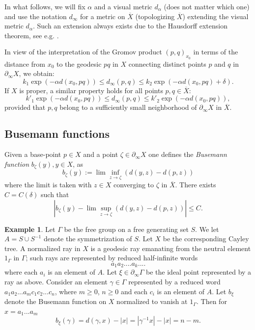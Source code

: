 \documentclass[12pt]{amsbook}%
\theoremstyle{definition}
\newtheorem{example}[thm]{Example}
\theoremstyle{remark}
\numberwithin{section}{chapter}
\numberwithin{subsection}{section}
\numberwithin{figure}{chapter}
\def\Ga{\Gamma}
\def\ga{\gamma}
\def\geo{\partial_\infty}
\def\ol{\overline}
\begin{document}
\medskip 
In what follows, we will fix $\alpha$ and a visual metric $d_\alpha$ (does not matter which one) and 
use the notation $d_\infty$ for a metric on $\ol{X}$ (topologizing $\ol{X}$) extending the visual metric $d_\alpha$. Such an extension 
always exists due to the Hausdorff extension theorem, see e.g. \cite{h-extension}. 

In view of the interpretation of the Gromov product $(p,q)_{x_0}$ in terms of the distance from $x_0$ to the geodesic $pq$ in $X$ connecting 
distinct points $p$ and $q$ in $\geo X$, we obtain:
\begin{equation*} 
k_1\exp(- \alpha d(x_0, pq)) \leqslant d_\infty(p,q) \leqslant  k_2 \exp (- \alpha d(x_0, pq) +\delta).  
\end{equation*}
If $X$ is proper, a similar property holds for all points $p, q\in \ol{X}$:
\begin{equation}\label{eq:dinfty} 
k'_1\exp(- \alpha d(x_0, pq)) \leqslant d_\infty(p,q) \leqslant  k'_2 \exp (- \alpha d(x_0, pq)),  
\end{equation}
provided that $p, q$ belong to a sufficiently small neighborhood of $\geo X$ in $\ol{X}$.  





\subsection{Busemann functions}\label{sec:Busemann functions}


Given a base-point $p\in X$ and a point $\zeta\in \geo X$ one defines the {\em Busemann function} $b_\zeta(y), y\in X$, as
\begin{equation}\label{eq:busemann} 
b_\zeta(y):= \lim\inf_{z\to \zeta} (d(y, z)- d(p,z))
\end{equation}
where the limit is taken with $z\in X$ converging to $\zeta$ in $\ol{X}$. There exists $C=C(\delta)$ such that
$$
|b_\zeta(y)- \lim\sup_{z\to \zeta} (d(y, z)- d(p,z))|\le C. 
$$

\begin{example}\label{ex:Busemann}
Let $\Ga$ be the free group on a free generating set $S$. We let $A=S\cup S^{-1}$ denote the symmetrization of $S$. Let $X$ be the corresponding Cayley tree. A normalized ray in $X$ is a geodesic ray emanating from the neutral element $1_\Ga$ in $\Ga$; such rays are represented by reduced half-infinite words
$$
a_1a_2....a_k....
$$
where each $a_i$ is an element of $A$. Let $\xi\in \geo \Ga$ be the ideal point represented by a ray as above. Consider an element $\ga\in \Ga$ represented by a reduced word $a_1a_2...a_mc_1c_2...c_n$, where $m\ge 0$, $n\ge 0$ and each $c_i$ is an element of $A$. Let $b_\xi$ denote the Busemann function on $X$ normalized to vanish at $1_\Ga$. Then for $x=a_1...a_m$
$$
b_\xi(\ga)= d(\ga, x) - |x| = |\ga^{-1}x| - |x|= n-m. 
$$
\end{example}
\end{document}
